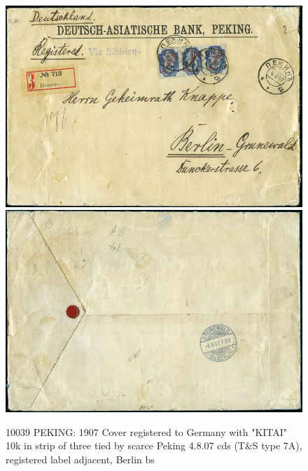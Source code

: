\begin{figure}[htbp]
\centering
\includegraphics[width=.95\textwidth]{../russian-post-offices-in-china/10039.jpg}
\includegraphics[width=.95\textwidth]{../russian-post-offices-in-china/10039-1.jpg}
\caption{
10039 PEKING: 1907 Cover registered to Germany with "KITAI" 10k in 
strip of three tied by scarce Peking 4.8.07 cds (T\&S type 7A), registered 
label adjacent, Berlin bs
}  
\end{figure} 

